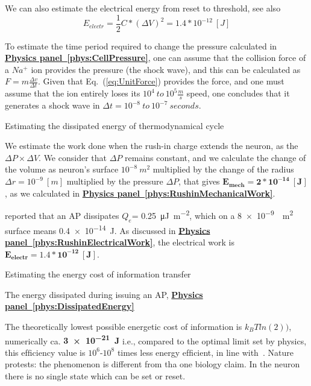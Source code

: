 {
	We can also estimate the electrical energy 
	from reset to threshold, see also~~\cite{EnergyNeuralCommunication:2021}
	\[
	E_{electr}=\frac{1}{2} C*(\Delta V)^2 = 	
	1.4*10^{-12}\ [J]
	\]
}

{
	To estimate the time period required to change the pressure calculated in \textbf{\hyperlink{phys:CellPressure}{Physics panel~\ref{phys:CellPressure}}},
one can assume that the collision force of a $Na^+$ ion provides the pressure (the shock wave), and this can be calculated as $F = m\frac{\Delta v}{\Delta t}$. Given that Eq.~(\ref{eq:UnitForce})  provides the force, and one must assume that the ion entirely loses its 
	$10^4~to~10^5\frac{m}{s}$ speed, one concludes that it generates a shock wave in $\Delta t = 10^{-8}~to~10^{-7}~seconds$.
}

{Estimating the dissipated energy of thermodynamical cycle}
{
We estimate the work done when the rush-in charge
	extends the neuron, as the $\Delta P\times\Delta V$. We consider that $\Delta P$ remains constant, and we calculate the change of the volume as neuron's surface $10^{-8}\ m^2$ multiplied by 
	the change of the radius $\Delta r=10^{-9}\ [m]$ multiplied by the pressure $\Delta P$,
that gives $\mathbf{E_{mech}=2*10^{-14}\ [J]}$, 
as we calculated in \textbf{\hyperlink{phys:RushinMechanicalWork}{Physics panel~\ref{phys:RushinMechanicalWork}}}.
%

\cite{MechanicalWaves:2015} reported that an \gls{AP} dissipates $Q_e$= \SI{0.25}{\micro\joule\per \meter\squared}, which on a \SI{8e-9}{\per\meter\squared}
surface means \SI{0.4e-14}{\joule}. 
As discussed in 
\textbf{\hyperlink{phys:RushinElectricalWork}{Physics panel~\ref{phys:RushinElectricalWork}}}, 
the electrical work is $\mathbf{E_{electr}=1.4*10^{-12}\ [J]}$.

}

{Estimating the energy cost of information transfer}
{
The energy dissipated during issuing an \gls{AP},
\textbf{\hyperlink{phys:DissipatedEnergy}{Physics panel~\ref{phys:DissipatedEnergy}}}

The theoretically lowest possible energetic cost of information is $k_B T ln(2))$, numerically ca. \textbf{\SI{3e-21}{J}}
i.e., compared to the optimal limit set by physics, this efﬁciency value is $10^6$-$10^8$ times less energy efﬁcient, in line with~\cite{EnergyNeuralCommunication:2021}. Nature protests:
the phenomenon is different from tha one biology claim. In the neuron there is no single state which can be set or reset.

}